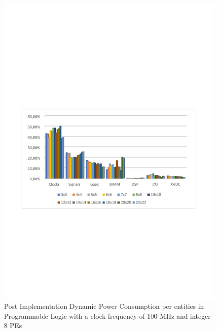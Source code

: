 \begin{itemize}
\begin{figure}[!htbp]
\includegraphics[scale=0.7,angle=0]{./figure/graphs/power_pldyn_div_int8_freq_100mhz.pdf}
\caption{Post Implementation Dynamic Power Consumption per entities in Programmable Logic with a clock frequency of 100 MHz and integer 8 PEs}
\label{fig:dynpowint8ent100}
\end{figure}
\begin{figure}[!htbp]
\centering
\captionsetup{justification=centering}

\end{figure}
\end{itemize}
